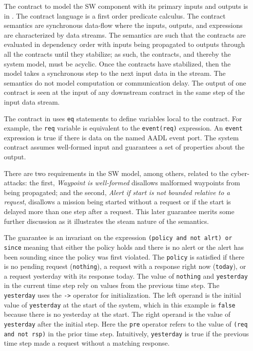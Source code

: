 The contract to model the SW component with its primary inputs and outputs is in . The contract language is a first order predicate calculus. The contract semantics are synchronous data-flow where the inputs, outputs, and expressions are characterized by data streams. The semantics are such that the contracts are evaluated in dependency order with inputs being propagated to outputs through all the contracts until they stabilize; as such, the contracts, and thereby the system model, must be acyclic. Once the contracts have stabilized, then the model takes a synchronous step to the next input data in the stream. The semantics do not model computation or communication delay. The output of one contract is seen at the input of any downstream contract in the same step of the input data stream. 

The contract in  uses \texttt{eq} statements to define variables local to the contract. For example, the \texttt{req} variable is equivalent to the \texttt{event(req)} expression. An \texttt{event} expression is true if there is data on the named AADL event port. The system contract assumes well-formed input and guarantees a set of properties about the output.

There are two requirements in the SW model, among others, related to the cyber-attacks: the first, \emph{Waypoint is well-formed} disallows malformed waypoints from being propagated; and the second, \emph{Alert if start is not bounded relative to a request}, disallows a mission being started without a request or if the start is delayed more than one step after a request. This later guarantee merits some further discussion as it illustrates the steam nature of the semantics.

The guarantee is an invariant on the expression \texttt{(policy and not alrt) or since} meaning that either the policy holds and there is no alert or the alert has been sounding since the policy was first violated. The \texttt{policy} is satisfied if there is no pending request (\texttt{nothing}), a request with a response right now (\texttt{today}), or a request yesterday with its response today. The value of \texttt{nothing} and \texttt{yesterday} in the current time step rely on values from the previous time step. The \texttt{yesterday} uses the \texttt{->} operator for initialization. The left operand is the initial value of \texttt{yesterday} at the start of the system, which in this example is \texttt{false} because there is no yesterday at the start.  The right operand is the value of \texttt{yesterday} after the initial step. Here the \texttt{pre} operator refers to the value of \texttt{(req and not rsp)} in the prior time step. Intuitively, \texttt{yesterday} is true if the previous time step made a request without a matching response. 

